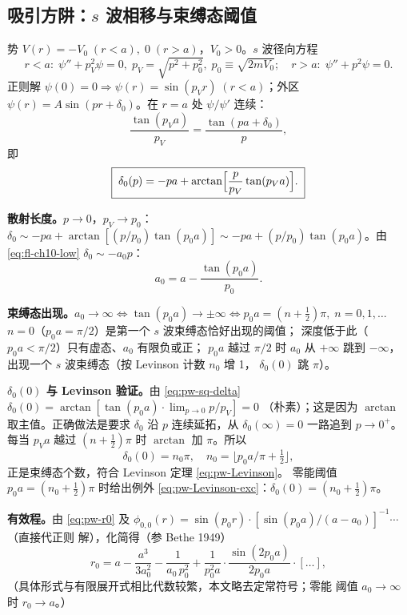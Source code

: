 \subsection{吸引方阱：$s$ 波相移与束缚态阈值}\label{sec:pw-square-well}

势 $V(r)=-V_0\;(r<a),\;0\;(r>a)$，$V_0>0$。$s$ 波径向方程
\[
r<a:\;\psi''+p_V^2\psi=0,\;p_V=\sqrt{p^2+p_0^2},\;p_0\equiv\sqrt{2mV_0};
\quad
r>a:\;\psi''+p^2\psi=0.
\]
正则解 $\psi(0)=0\Rightarrow\psi(r)=\sin(p_V r)\;(r<a)$；外区
$\psi(r)=A\sin(pr+\delta_0)$。在 $r=a$ 处 $\psi/\psi'$ 连续：
\begin{equation}\label{eq:pw-sq-match}
\frac{\tan(p_V a)}{p_V}=\frac{\tan(pa+\delta_0)}{p},
\end{equation}
即
\begin{equation}\label{eq:pw-sq-delta}
\boxed{\;\delta_0(p)=-pa+\arctan\Bigl[\frac{p}{p_V}\tan(p_V a)\Bigr].\;}
\end{equation}

\textbf{散射长度。}$p\to 0$，$p_V\to p_0$：
$\delta_0\sim -pa+\arctan[(p/p_0)\tan(p_0 a)]
\sim -pa+(p/p_0)\tan(p_0 a)$。由 \eqref{eq:fl-ch10-low}
$\delta_0\sim -a_0 p$：
\begin{equation}\label{eq:pw-sq-a0}
\boxed{\;a_0=a-\frac{\tan(p_0 a)}{p_0}.\;}
\end{equation}

\textbf{束缚态出现。}$a_0\to\infty\Leftrightarrow
\tan(p_0 a)\to\pm\infty\Leftrightarrow p_0 a=(n+\tfrac12)\pi,\;n=0,1,\ldots$
$n=0$（$p_0 a=\pi/2$）是第一个 $s$ 波束缚态恰好出现的阈值；
深度低于此（$p_0 a<\pi/2$）只有虚态、$a_0$ 有限负或正；
$p_0 a$ 越过 $\pi/2$ 时 $a_0$ 从 $+\infty$ 跳到 $-\infty$，
出现一个 $s$ 波束缚态（按 Levinson 计数 $n_0$ 增 1，
$\delta_0(0)$ 跳 $\pi$）。

\textbf{$\delta_0(0)$ 与 Levinson 验证。}由 \eqref{eq:pw-sq-delta}
$\delta_0(0)=\arctan[\tan(p_0 a)\cdot\lim_{p\to 0}p/p_V]=0$
（朴素）；这是因为 $\arctan$ 取主值。正确做法是要求
$\delta_0$ 沿 $p$ 连续延拓，从 $\delta_0(\infty)=0$ 一路追到
$p\to 0^+$。每当 $p_V a$ 越过 $(n+\tfrac12)\pi$ 时
$\arctan$ 加 $\pi$。所以
\[
\delta_0(0)=n_0\pi,\quad n_0=\lfloor p_0 a/\pi+\tfrac12\rfloor,
\]
正是束缚态个数，符合 Levinson 定理 \eqref{eq:pw-Levinson}。
零能阈值 $p_0 a=(n_0+\tfrac12)\pi$ 时给出例外
\eqref{eq:pw-Levinson-exc}：$\delta_0(0)=(n_0+\tfrac12)\pi$。

\textbf{有效程。}由 \eqref{eq:pw-r0} 及 $\phi_{0,0}(r)=
\sin(p_0 r)\cdot[\sin(p_0 a)/(a-a_0)]^{-1}\cdots$（直接代正则
解），化简得（参 Bethe 1949）
\begin{equation}\label{eq:pw-sq-r0}
r_0= a-\frac{a^3}{3a_0^2}-\frac{1}{a_0\,p_0^2}+\frac{1}{p_0^2 a}\cdot\frac{\sin(2p_0 a)}{2 p_0 a}\cdot[\ldots],
\end{equation}
（具体形式与有限展开式相比代数较繁，本文略去定常符号；零能
阈值 $a_0\to\infty$ 时 $r_0\to a$。）

